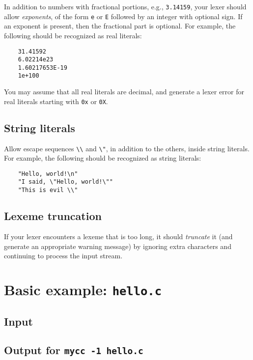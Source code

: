 \documentclass{article}
\begin{document}
In addition to numbers with fractional portions,
e.g., \verb|3.14159|,
your lexer should allow \emph{exponents},
of the form \verb|e| or \verb|E| followed by an integer with optional sign.
If an exponent is present, then the fractional part is optional.
For example,
the following should be recognized as real literals:
\begin{verbatim}
	31.41592
	6.02214e23
	1.60217653E-19
	1e+100
\end{verbatim}
You may assume that all real literals are decimal,
and generate a lexer error for real literals starting
with \verb|0x| or \verb|0X|.

\subsection{String literals}

Allow escape sequences \verb|\\| and \verb|\"|,
in addition to the others, inside string literals.
For example, the following should be recognized as string literals:
\begin{verbatim}
	"Hello, world!\n"
	"I said, \"Hello, world!\""
	"This is evil \\"
\end{verbatim}

\subsection{Lexeme truncation}

If your lexer encounters a lexeme that is too long,
it should \emph{truncate} it
(and generate an appropriate warning message)
by ignoring extra characters
and continuing to process the input stream.

\section{Basic example: {\tt hello.c}}

\subsection{Input}



\subsection{Output for {\tt mycc -1 hello.c}}
\end{document}
